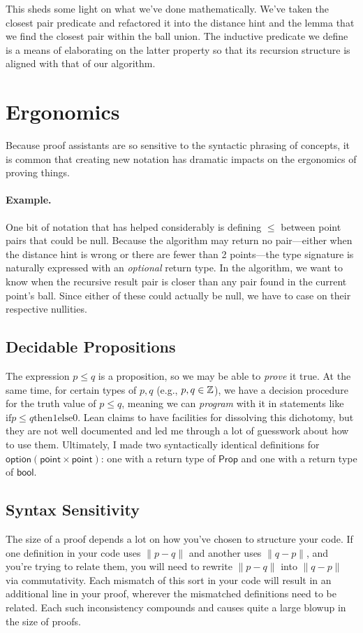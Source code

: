 \documentclass{article}
\begin{document}
This sheds some light on what we've done mathematically.
We've taken the closest pair predicate and refactored it into the distance hint and the lemma that we find the closest pair within the ball union.
The inductive predicate we define is a means of elaborating on the latter property so that its recursion structure is aligned with that of our algorithm.


\section{Ergonomics}
Because proof assistants are so sensitive to the syntactic phrasing of concepts, it is common that creating new notation has dramatic impacts on the ergonomics of proving things.

\paragraph{Example.}
One bit of notation that has helped considerably is defining $\leq$ between point pairs that could be null.
Because the algorithm may return no pair---either when the distance hint is wrong or there are fewer than 2 points---the type signature is naturally expressed with an \textit{optional} return type.
In the algorithm, we want to know when the recursive result pair is closer than any pair found in the current point's ball.
Since either of these could actually be null, we have to case on their respective nullities.


\subsection{Decidable Propositions}
The expression $p \leq q$ is a proposition, so we may be able to \textit{prove} it true.
At the same time, for certain types of $p, q$ (e.g., $p, q \in \mathbb{Z}$), we have a decision procedure for the truth value of $p \leq q$, meaning we can \textit{program} with it in statements like $\text{if} p \leq q \text{then} 1 \text{else} 0$.
Lean claims to have facilities for dissolving this dichotomy, but they are not well documented and led me through a lot of guesswork about how to use them.
Ultimately, I made two syntactically identical definitions for $\mathsf{option} (\mathsf{point} \times \mathsf{point})$: one with a return type of $\mathsf{Prop}$ and one with a return type of $\mathsf{bool}$.

\subsection{Syntax Sensitivity}
The size of a proof depends a lot on how you've chosen to structure your code.
If one definition in your code uses $\| p - q \|$ and another uses $\| q - p \|$, and you're trying to relate them, you will need to rewrite $\| p - q \|$ into $\| q - p \|$ via commutativity.
Each mismatch of this sort in your code will result in an additional line in your proof, wherever the mismatched definitions need to be related.
Each such inconsistency compounds and causes quite a large blowup in the size of proofs.
\end{document}

